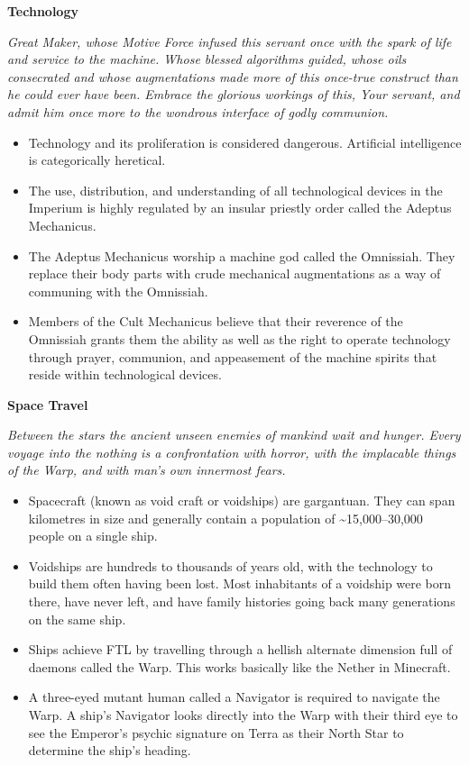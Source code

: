 \documentclass[10pt,a4paper]{article}
\newcommand{\rpgsection}[1]{%
  \vspace{0.8em}%
  {\headerfont\bfseries\Large #1}\par%
  \vspace{0.5em}%
}
\begin{document}
\begin{multicols}{2}
\newpage

\rpgsection{Technology}
\textit{Great Maker, whose Motive Force infused this servant once with the spark of life and service to the machine. Whose blessed algorithms guided, whose oils consecrated and whose augmentations made more of this once-true construct than he could ever have been. Embrace the glorious workings of this, Your servant, and admit him once more to the wondrous interface of godly communion.}

\begin{itemize}
  \item Technology and its proliferation is considered dangerous. Artificial intelligence is categorically heretical.
  \item The use, distribution, and understanding of all technological devices in the Imperium is highly regulated by an insular priestly order called the Adeptus Mechanicus.
  \item The Adeptus Mechanicus worship a machine god called the Omnissiah. They replace their body parts with crude mechanical augmentations as a way of communing with the Omnissiah.
  \item Members of the Cult Mechanicus believe that their reverence of the Omnissiah grants them the ability as well as the right to operate technology through prayer, communion, and appeasement of the machine spirits that reside within technological devices.
\end{itemize}

\rpgsection{Space Travel}
\textit{Between the stars the ancient unseen enemies of mankind wait and hunger. Every voyage into the nothing is a confrontation with horror, with the implacable things of the Warp, and with man's own innermost fears.}

\begin{itemize}
  \item Spacecraft (known as void craft or voidships) are gargantuan. They can span kilometres in size and generally contain a population of \textasciitilde15,000–30,000 people on a single ship.
  \item Voidships are hundreds to thousands of years old, with the technology to build them often having been lost. Most inhabitants of a voidship were born there, have never left, and have family histories going back many generations on the same ship.
  \item Ships achieve FTL by travelling through a hellish alternate dimension full of daemons called the Warp. This works basically like the Nether in Minecraft.
  \item A three-eyed mutant human called a Navigator is required to navigate the Warp. A ship’s Navigator looks directly into the Warp with their third eye to see the Emperor’s psychic signature on Terra as their North Star to determine the ship’s heading.
\end{itemize}


\end{multicols}
\end{document}
